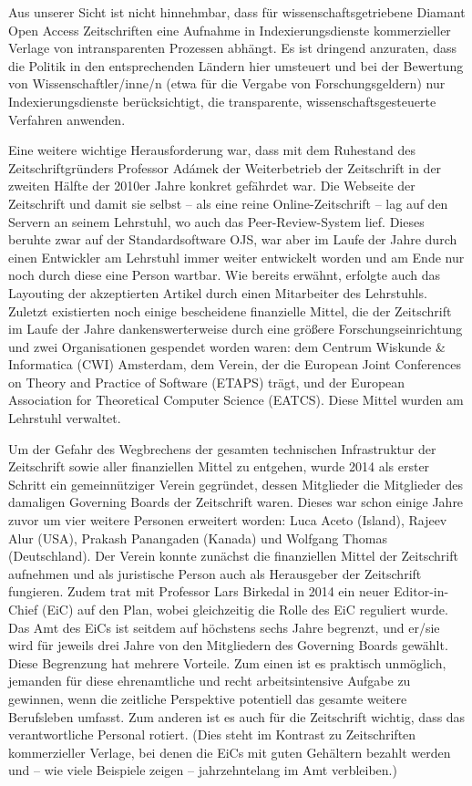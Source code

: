 \documentclass[a4paper,
fontsize=11pt,
oneside,
numbers=noperiodatend,
parskip=half-,
bibliography=totoc,
final
]{scrartcl}
\begin{document}
Aus unserer Sicht ist nicht hinnehmbar, dass für wissenschaftsgetriebene
Diamant Open Access Zeitschriften eine Aufnahme in Indexierungsdienste
kommerzieller Verlage von intransparenten Prozessen abhängt. Es ist
dringend anzuraten, dass die Politik in den entsprechenden Ländern hier
umsteuert und bei der Bewertung von Wissenschaftler/inne/n (etwa für die
Vergabe von Forschungsgeldern) nur Indexierungsdienste berücksichtigt,
die transparente, wissenschaftsgesteuerte Verfahren anwenden.

Eine weitere wichtige Herausforderung war, dass mit dem Ruhestand des
Zeitschriftgründers Professor Adámek der Weiterbetrieb der Zeitschrift
in der zweiten Hälfte der 2010er Jahre konkret gefährdet war. Die
Webseite der Zeitschrift und damit sie selbst -- als eine reine
Online-Zeitschrift -- lag auf den Servern an seinem Lehrstuhl, wo auch
das Peer-Review-System lief. Dieses beruhte zwar auf der
Standardsoftware OJS, war aber im Laufe der Jahre durch einen Entwickler
am Lehrstuhl immer weiter entwickelt worden und am Ende nur noch durch
diese eine Person wartbar. Wie bereits erwähnt, erfolgte auch das
Layouting der akzeptierten Artikel durch einen Mitarbeiter des
Lehrstuhls. Zuletzt existierten noch einige bescheidene finanzielle
Mittel, die der Zeitschrift im Laufe der Jahre dankenswerterweise durch
eine größere Forschungseinrichtung und zwei Organisationen gespendet
worden waren: dem Centrum Wiskunde \& Informatica (CWI) Amsterdam, dem
Verein, der die European Joint Conferences on Theory and Practice of
Software (ETAPS) trägt, und der European Association for Theoretical
Computer Science (EATCS). Diese Mittel wurden am Lehrstuhl verwaltet.

Um der Gefahr des Wegbrechens der gesamten technischen Infrastruktur der
Zeitschrift sowie aller finanziellen Mittel zu entgehen, wurde 2014 als
erster Schritt ein gemeinnütziger Verein gegründet, dessen Mitglieder
die Mitglieder des damaligen Governing Boards der Zeitschrift waren.
Dieses war schon einige Jahre zuvor um vier weitere Personen erweitert
worden: Luca Aceto (Island), Rajeev Alur (USA), Prakash Panangaden
(Kanada) und Wolfgang Thomas (Deutschland). Der Verein konnte zunächst
die finanziellen Mittel der Zeitschrift aufnehmen und als juristische
Person auch als Herausgeber der Zeitschrift fungieren. Zudem trat mit
Professor Lars Birkedal in 2014 ein neuer Editor-in-Chief (EiC) auf den
Plan, wobei gleichzeitig die Rolle des EiC reguliert wurde. Das Amt des
EiCs ist seitdem auf höchstens sechs Jahre begrenzt, und er/sie wird für
jeweils drei Jahre von den Mitgliedern des Governing Boards gewählt.
Diese Begrenzung hat mehrere Vorteile. Zum einen ist es praktisch
unmöglich, jemanden für diese ehrenamtliche und recht arbeitsintensive
Aufgabe zu gewinnen, wenn die zeitliche Perspektive potentiell das
gesamte weitere Berufsleben umfasst. Zum anderen ist es auch für die
Zeitschrift wichtig, dass das verantwortliche Personal rotiert. (Dies
steht im Kontrast zu Zeitschriften kommerzieller Verlage, bei denen die
EiCs mit guten Gehältern bezahlt werden und -- wie viele Beispiele
zeigen -- jahrzehntelang im Amt verbleiben.)
\end{document}
